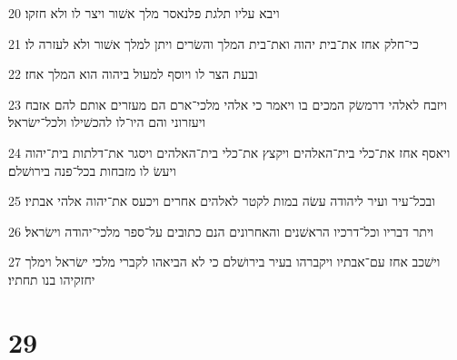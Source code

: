 \par 20 ויבא עליו תלגת פלנאסר מלך אשׁור ויצר לו ולא חזקו׃
\par 21 כי־חלק אחז את־בית יהוה ואת־בית המלך והשׂרים ויתן למלך אשׁור ולא לעזרה לו׃
\par 22 ובעת הצר לו ויוסף למעול ביהוה הוא המלך אחז׃
\par 23 ויזבח לאלהי דרמשׂק המכים בו ויאמר כי אלהי מלכי־ארם הם מעזרים אותם להם אזבח ויעזרוני והם היו־לו להכשׁילו ולכל־ישׂראל׃
\par 24 ויאסף אחז את־כלי בית־האלהים ויקצץ את־כלי בית־האלהים ויסגר את־דלתות בית־יהוה ויעשׂ לו מזבחות בכל־פנה בירושׁלם׃
\par 25 ובכל־עיר ועיר ליהודה עשׂה במות לקטר לאלהים אחרים ויכעס את־יהוה אלהי אבתיו׃
\par 26 ויתר דבריו וכל־דרכיו הראשׁנים והאחרונים הנם כתובים על־ספר מלכי־יהודה וישׂראל׃
\par 27 וישׁכב אחז עם־אבתיו ויקברהו בעיר בירושׁלם כי לא הביאהו לקברי מלכי ישׂראל וימלך יחזקיהו בנו תחתיו׃

\chapter{29}

